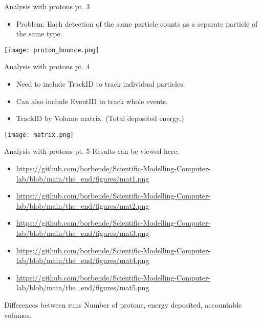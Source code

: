 \documentclass[11pt]{beamer}
\begin{document}
\begin{frame}{Analysis with protons pt. 3}
    \begin{itemize}
        \item<tri@1-> Problem: Each detection of the same particle counts as a separate particle of the same type.
        \vspace{0.4 cm}
    \end{itemize}
    \centering
    \texttt{[image: proton\_bounce.png]}
\end{frame}

\begin{frame}{Analysis with protons pt. 4}
    \begin{itemize}
        \item<tri@1-> Need to include TrackID to track individual particles.
        \item<tri@1-> Can also include EventID to track whole events.
        \item<tri@1-> TrackID by Volume matrix. (Total deposited energy.)
    \end{itemize}
    \centering
    \texttt{[image: matrix.png]}
\end{frame}

\begin{frame}{Analysis with protons pt. 5}
Results can be viewed here:
    \begin{itemize}
        \item<tri@1-> \url{https://github.com/borbende/Scientific-Modelling-Computer-lab/blob/main/the_end/figures/mat1.png}
        \item<tri@1-> \url{https://github.com/borbende/Scientific-Modelling-Computer-lab/blob/main/the_end/figures/mat2.png}
        \item<tri@1-> \url{https://github.com/borbende/Scientific-Modelling-Computer-lab/blob/main/the_end/figures/mat3.png}
        \item<tri@1-> \url{https://github.com/borbende/Scientific-Modelling-Computer-lab/blob/main/the_end/figures/mat4.png}
        \item<tri@1-> \url{https://github.com/borbende/Scientific-Modelling-Computer-lab/blob/main/the_end/figures/mat5.png}
    \end{itemize}
    
    \begin{block}{Differences between runs}
    Number of protons, energy deposited, accountable volumes.
    \end{block}
\end{frame}
\end{document}
